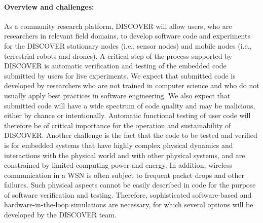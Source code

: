 \paragraph{Overview and challenges:}
As a community research platform, DISCOVER will allow users, who are researchers in relevant field domains, to develop software code and experiments for the DISCOVER stationary nodes (i.e., sensor nodes) and mobile nodes (i.e., terrestrial robots and drones).
A critical step of the process supported by DISCOVER is automatic verification and testing of the embedded code submitted by users for live experiments.
We expect that submitted code is developed by researchers who are not trained in computer science and who do not usually apply best practices in software engineering.
We also expect that submitted code will have a wide spectrum of code quality and may be malicious, either by chance or intentionally.
Automatic functional testing of user code will therefore be of critical importance for the operation and sustainability of DISCOVER.
Another challenge is the fact that the code to be tested and verified is for embedded systems that have highly complex physical dynamics %
and interactions with the physical world and with other physical systems, and are constrained by limited computing power and energy.
In addition, wireless communication in a WSN is often subject to frequent packet drops and other failures.
Such physical aspects cannot be easily described in code for the purpose of software verification and testing.
Therefore, sophisticated software-based and hardware-in-the-loop simulations %
are necessary, for which several options will be developed by the DISCOVER team.

